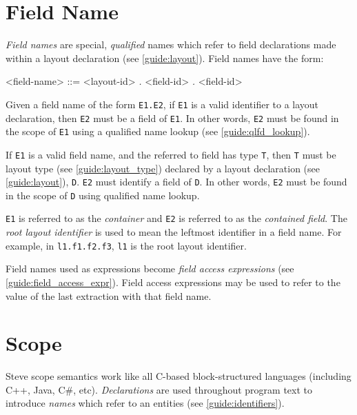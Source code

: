 \section{Field Name} \label{guide:field_name}

\textit{Field names} are special, \textit{qualified} names which refer to field declarations made within a layout declaration (see \ref{guide:layout}). Field names have the form:

\begin{minip}
\begin{grammar}
<field-name> ::=
<layout-id> \textit{.} <field-id>
 \textit{.} <field-id>
\end{grammar}
\end{minip}

Given a field name of the form \texttt{E1.E2}, if \texttt{E1} is a valid identifier to a layout declaration, then \texttt{E2} must be a field of \texttt{E1}. In other words, \texttt{E2} must be found in the scope of \texttt{E1} using a qualified name lookup (see \ref{guide:qlfd_lookup}).

If \texttt{E1} is a valid field name, and the referred to field has type \texttt{T}, then \texttt{T} must be layout type (see \ref{guide:layout_type}) declared by a layout declaration (see \ref{guide:layout}), \texttt{D}. \texttt{E2} must identify a field of \texttt{D}.  In other words, \texttt{E2} must be found in the scope of \texttt{D} using qualified name lookup.

\texttt{E1} is referred to as the \textit{container} and \texttt{E2} is referred to as the \textit{contained field}. The \textit{root layout identifier} is used to mean the leftmost identifier in a field name. For example, in \texttt{l1.f1.f2.f3}, \texttt{l1} is the root layout identifier.

Field names used as expressions become \textit{field access expressions} (see \ref{guide:field_access_expr}). Field access expressions may be used to refer to the value of the last extraction with that field name.

\section{Scope} \label{guide:scope}

Steve scope semantics work like all C-based block-structured languages (including C++, Java, C\#, etc). 
\textit{Declarations} are used throughout program text to introduce \textit{names} which refer to an entities (see \ref{guide:identifiers}). 

